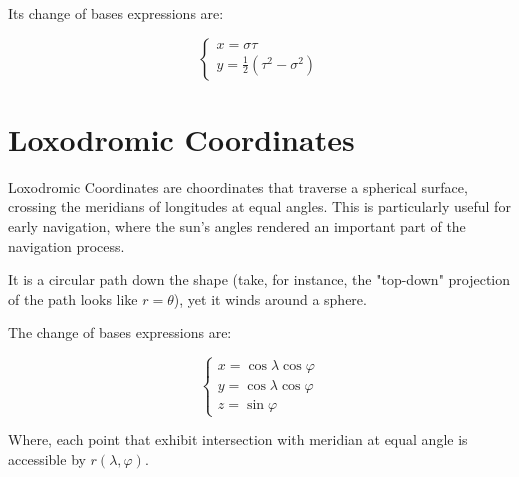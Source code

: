 \documentclass[letterpaper]{article}
\begin{document}
Its change of bases expressions are:

\begin{equation}
   \begin{cases}
   x = \sigma \tau \\ 
   y = \frac{1}{2}(\tau^2-\sigma^2) 
\end{cases}
\end{equation}

\section{Loxodromic Coordinates}
\label{sec:orga496af8}
Loxodromic Coordinates are choordinates that traverse a spherical surface, crossing the meridians of longitudes at equal angles. This is particularly useful for early navigation, where the sun's angles rendered an important part of the navigation process.

It is a circular path down the shape (take, for instance, the "top-down" projection of the path looks like \(r=\theta\)), yet it winds around a sphere.

The change of bases expressions are:

\begin{equation}
\begin{cases}
x = \cos\lambda \cos\varphi\\
y = \cos\lambda \cos\varphi\\
z = \sin\varphi
\end{cases}
\end{equation}

Where, each point that exhibit intersection with meridian at equal angle is accessible by \(r(\lambda, \varphi)\).
\end{document}
